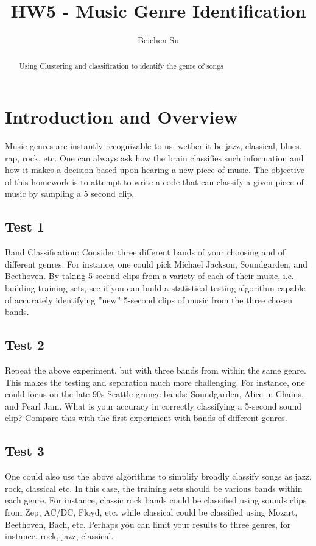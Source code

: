 \documentclass[12pt,letterpaper]{article}
\begin{document}
\title{HW5 - Music Genre Identification}
\author{Beichen Su}

\maketitle

\begin{abstract}
Using Clustering and classification to identify the genre of songs
\end{abstract}

\newpage
\section{Introduction and Overview}
Music genres are instantly recognizable to us, wether it be jazz, classical, blues, rap, rock, etc.
One can always ask how the brain classifies such information and how it makes a decision based
upon hearing a new piece of music. The objective of this homework is to attempt to write a code
that can classify a given piece of music by sampling a 5 second clip.\\
\subsection{Test 1}
Band Classification: Consider three different bands of your choosing and of different
genres. For instance, one could pick Michael Jackson, Soundgarden, and Beethoven. By taking
5-second clips from a variety of each of their music, i.e. building training sets, see if you can
build a statistical testing algorithm capable of accurately identifying ”new” 5-second clips of
music from the three chosen bands.
\subsection{Test 2}
Repeat the above experiment, but with three bands from
within the same genre. This makes the testing and separation much more challenging. For
instance, one could focus on the late 90s Seattle grunge bands: Soundgarden, Alice in Chains,
and Pearl Jam. What is your accuracy in correctly classifying a 5-second sound clip? Compare
this with the first experiment with bands of different genres.
\subsection{Test 3}
One could also use the above algorithms to simplify broadly
classify songs as jazz, rock, classical etc. In this case, the training sets should be various bands
within each genre. For instance, classic rock bands could be classified using sounds clips from
Zep, AC/DC, Floyd, etc. while classical could be classified using Mozart, Beethoven, Bach,
etc. Perhaps you can limit your results to three genres, for instance, rock, jazz, classical.
\newline 
\end{document}
